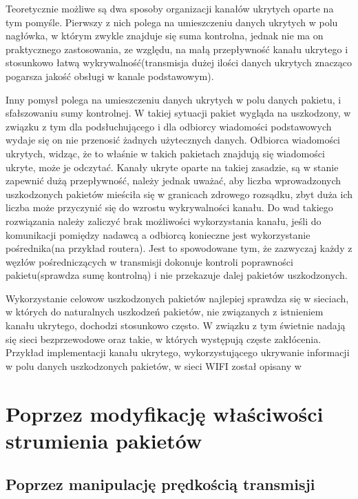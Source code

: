 \documentclass[a4paper, twoside]{report}
\begin{document}
        Teoretycznie możliwe są dwa
        sposoby organizacji kanałów ukrytych oparte na tym pomyśle. Pierwszy z nich polega na umieszczeniu
        danych ukrytych w polu nagłówka, w którym zwykle znajduje się suma kontrolna,
        jednak nie ma on praktycznego zastosowania, ze względu, na małą przepływność
        kanału ukrytego i stosunkowo łatwą wykrywalność(transmisja dużej ilości
        danych ukrytych znacząco pogarsza jakość obsługi w kanale podstawowym).

        Inny pomysł polega
        na umieszczeniu danych ukrytych w polu danych pakietu, i sfałszowaniu sumy
        kontrolnej. W takiej sytuacji pakiet wygląda na uszkodzony, w związku z tym
        dla podsłuchującego i dla odbiorcy wiadomości podstawowych wydaje się
        on nie przenosić żadnych użytecznych danych. Odbiorca wiadomości ukrytych,
        widząc, że to właśnie w takich pakietach znajdują się wiadomości ukryte,
        może je odczytać. Kanały ukryte oparte na takiej zasadzie, są w stanie
        zapewnić dużą przepływność, należy jednak uważać, aby liczba wprowadzonych
        uszkodzonych pakietów mieściła się w granicach zdrowego rozsądku, zbyt duża
        ich liczba może przyczynić się do wzrostu wykrywalności kanału. Do wad takiego
        rozwiązania należy zaliczyć brak możliwości wykorzystania kanału, jeśli do
        komunikacji pomiędzy nadawcą a odbiorcą konieczne jest wykorzystanie pośrednika(na przykład routera).
        Jest to spowodowane tym, że zazwyczaj każdy z węzłów pośredniczących w transmisji
        dokonuje kontroli poprawności pakietu(sprawdza sumę kontrolną) i nie przekazuje
        dalej pakietów uszkodzonych.

        Wykorzystanie celowow uszkodzonych pakietów najlepiej sprawdza się w
        sieciach, w których do naturalnych uszkodzeń pakietów, nie związanych z
        istnieniem kanału ukrytego, dochodzi stosunkowo często. W związku z tym
        świetnie nadają się sieci bezprzewodowe oraz takie, w których występują
        częste zakłócenia. Przykład implementacji kanału ukrytego, wykorzystującego
        ukrywanie informacji w polu danych uszkodzonych pakietów, w sieci WIFI
        został opisany w \cite{HICCUPS}

    \section{Poprzez modyfikację właściwości strumienia pakietów}
        \subsection{Poprzez manipulację prędkością transmisji}
\end{document}
